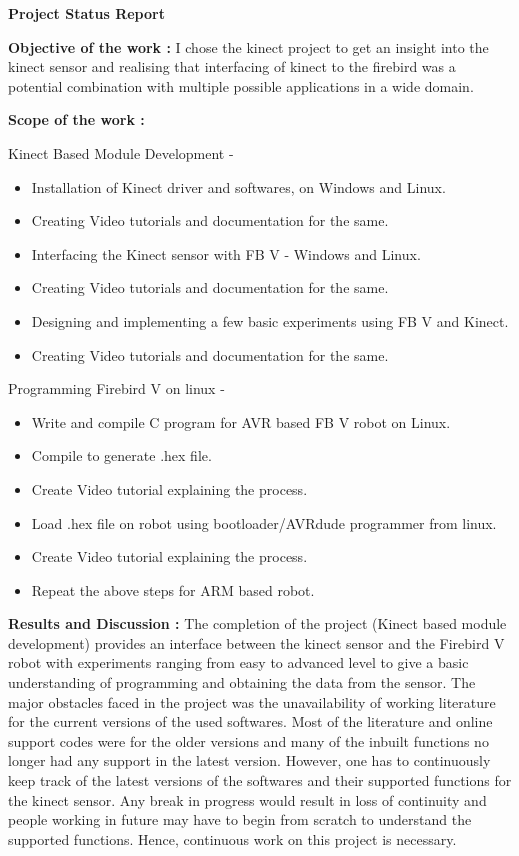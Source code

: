 \documentclass[20pt]{report}
\begin{document}
\vspace{0.5in}

\hspace{2.5in}
\textbf{Project Status Report}
\medskip

\textbf{Objective of the work : }
I chose the kinect project to get an insight into the kinect sensor and realising that interfacing of kinect to the firebird was a potential combination with multiple possible applications in a wide domain.

\medskip

\textbf{Scope of the work : }

Kinect Based Module Development -
\begin{itemize}


\item Installation of Kinect driver and softwares, on Windows and Linux.
\item Creating Video tutorials and documentation for the same.
\item Interfacing the Kinect sensor with FB V - Windows and Linux.
\item Creating Video tutorials and documentation for the same.
\item Designing and implementing a few basic experiments using FB V and Kinect.
\item Creating Video tutorials and documentation for the same.
\end{itemize}

Programming Firebird V on linux - 
\begin{itemize}


\item Write and compile C program for AVR based FB V robot on Linux.
\item Compile to generate .hex file.
\item Create Video tutorial explaining the process.
\item Load .hex file on robot using bootloader/AVRdude programmer from linux.
\item Create Video tutorial explaining the process.
\item Repeat the above steps for ARM based robot.
\end{itemize}

\medskip

\textbf{Results and Discussion : }
The completion of the project (Kinect based module development) provides an interface between the kinect sensor and the Firebird V robot with experiments ranging from easy to advanced level to give a basic understanding of programming and obtaining the data from the sensor. The major obstacles faced in the project was the unavailability of working literature for the current versions of  the used softwares. Most of the literature and online support codes were for the older versions and many of the inbuilt functions no longer had any support in the latest version.
However, one has to continuously keep track of the latest versions of the softwares and their supported functions for the kinect sensor. Any break in progress would result in loss of continuity and people working in future may have to begin from scratch to understand the supported functions. Hence, continuous work on this project is necessary.
\end{document}
